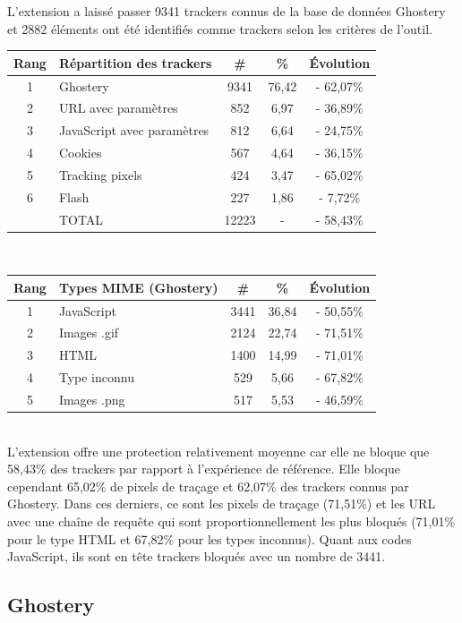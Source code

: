 L'extension a laissé passer 9341 trackers connus de la base de données Ghostery et 2882 éléments ont été identifiés comme trackers selon les critères de l'outil.\\

\begin{tabular}{ c | p{5cm} | c | c || c | }
   Rang & Répartition des trackers & \# & \% & Évolution \\
   \hline
   \hline
   1 & Ghostery & 9341 & 76,42 & - 62,07\% \\
   2 & URL avec paramètres & 852 & 6,97 & - 36,89\% \\
   3 & JavaScript avec paramètres & 812 & 6,64 & - 24,75\% \\
   4 & Cookies & 567 & 4,64 & - 36,15\% \\
   5 & Tracking pixels & 424 & 3,47 & - 65,02\% \\
   6 & Flash & 227 & 1,86 & - 7,72\% \\
   \hline
    & TOTAL & 12223 & - & - 58,43\%\\
   \hline
\end{tabular}
\\[1cm]

\begin{tabular}{ c | p{5cm} | c | c | c | }
   Rang & Types MIME (Ghostery) & \# & \% & Évolution\\
   \hline
   \hline
   1 & JavaScript & 3441 & 36,84 & - 50,55\% \\
   2 & Images .gif & 2124 & 22,74 & - 71,51\% \\
   3 & HTML & 1400 & 14,99 & - 71,01\% \\
   4 & Type inconnu & 529 & 5,66 & - 67,82\% \\
   5 & Images .png & 517 & 5,53 & - 46,59\% \\
   \hline
\end{tabular}
\\[.3cm]

L'extension offre une protection relativement moyenne car elle ne bloque que 58,43\% des trackers par rapport à l'expérience de référence. Elle bloque cependant 65,02\% de pixels de traçage et 62,07\% des trackers connus par Ghostery. Dans ces derniers, ce sont les pixels de traçage (71,51\%) et les URL avec une chaîne de requête qui sont proportionnellement les plus bloqués (71,01\% pour le type HTML et 67,82\% pour les types inconnus). Quant aux codes JavaScript, ils sont en tête trackers bloqués avec un nombre de 3441.

\subsection{Ghostery}
